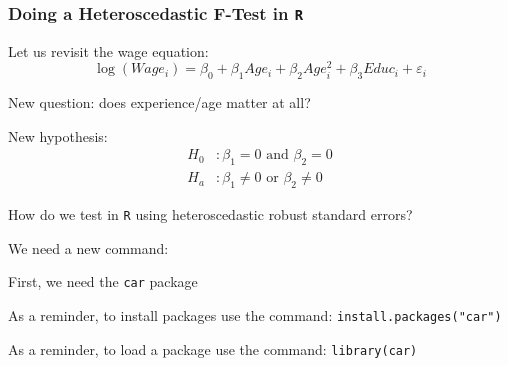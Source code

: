 \begin{frame}[fragile]\frametitle{Doing a Heteroscedastic F-Test in \texttt{R}}
	Let us revisit the wage equation:
	\[
		\log(Wage_i) = \beta_0 + \beta_1 Age_i + \beta_2 Age_i^2 + \beta_3 Educ_i + \varepsilon_i
	\]
	
	\begin{itemize}{\small 
		\item New question: does experience/age matter at all?
		\item New hypothesis:
			\begin{align*}
				H_0&: \beta_1 = 0\text{ and } \beta_2=0\\
				H_a&: \beta_1 \ne 0\text{ or } \beta_2\ne 0
			\end{align*}
		\item How do we test in \texttt{R} using heteroscedastic robust standard errors?}
	\end{itemize}

\vspace{5mm}

We need a new command:
\begin{itemize}{\small 
	\item First, we need the \verb!car! package
	\begin{itemize}{\footnotesize
		\item As a reminder, to install packages use the command: \verb!install.packages("car")!
		\item As a reminder, to load a package use the command: \verb!library(car)! }
	\end{itemize}
}
\end{itemize}
\end{frame}





